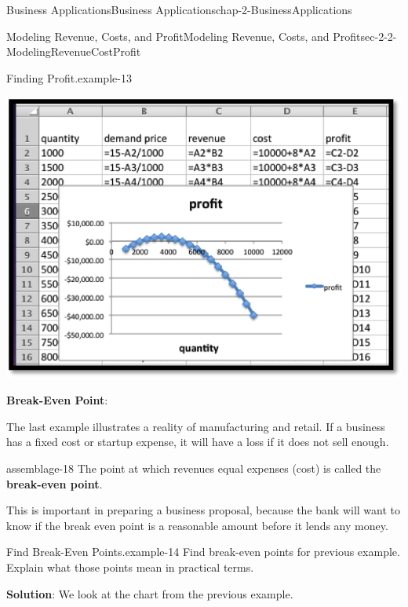 \documentclass[oneside,10pt,]{book}
\newcommand{\terminology}[1]{\textbf{#1}}
\numberwithin{equation}{section}
\begin{document}
\begin{chapterptx}{Business Applications}{}{Business Applications}{}{}{chap-2-BusinessApplications}
\begin{sectionptx}{Modeling Revenue, Costs, and Profit}{}{Modeling Revenue, Costs, and Profit}{}{}{sec-2-2-ModelingRevenueCostProfit}
\begin{example}{Finding Profit.}{example-13}
\begin{sidebyside}{1}{0.2}{0.2}{0}
\begin{sbspanel}{0.6}
\includegraphics[width=1\linewidth]{images/sec2-2-7.png}
\end{sbspanel}%
\end{sidebyside}%
\end{example}
\hypertarget{p-665}{}%
\terminology{Break-Even Point}:%
\par
\hypertarget{p-666}{}%
The last example illustrates a reality of manufacturing and retail.  If a business has a fixed cost or startup expense, it will have a loss if it does not sell enough.%
\begin{assemblage}{}{assemblage-18}%
\hypertarget{p-667}{}%
The point at which revenues equal expenses (cost) is called the \terminology{break-even point}.%
\end{assemblage}
\hypertarget{p-668}{}%
This is important in preparing a business proposal, because the bank will want to know if the break even point is a reasonable amount before it lends any money.%
\begin{example}{Find Break-Even Points.}{example-14}%
\hypertarget{p-669}{}%
Find break-even points for previous example.  Explain what those points mean in practical terms.%
\par
\hypertarget{p-670}{}%
\terminology{Solution}: We look at the chart from the previous example.%
\begin{sidebyside}{1}{0.2}{0.2}{0}%
\begin{sbspanel}{0.6}%

\end{sbspanel}
\end{sidebyside}
\end{example}
\end{sectionptx}
\end{chapterptx}
\end{document}
